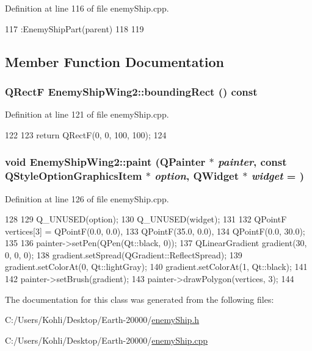 Definition at line 116 of file enemyShip.cpp.


\begin{DoxyCode}
117         :EnemyShipPart(parent)
118 {
119 }
\end{DoxyCode}


\subsection{Member Function Documentation}
\hypertarget{class_enemy_ship_wing2_aa7bb8e6e12d7f1853fbcfdac6d6a714a}{
\subsubsection[{boundingRect}]{\setlength{\rightskip}{0pt plus 5cm}QRectF EnemyShipWing2::boundingRect () const}}
\label{class_enemy_ship_wing2_aa7bb8e6e12d7f1853fbcfdac6d6a714a}


Definition at line 121 of file enemyShip.cpp.


\begin{DoxyCode}
122 {
123     return QRectF(0, 0, 100, 100);
124 }
\end{DoxyCode}
\hypertarget{class_enemy_ship_wing2_a85748bd6053efae322ff6eea88a31dea}{
\subsubsection[{paint}]{\setlength{\rightskip}{0pt plus 5cm}void EnemyShipWing2::paint (QPainter $\ast$ {\em painter}, \/  const QStyleOptionGraphicsItem $\ast$ {\em option}, \/  QWidget $\ast$ {\em widget} = {})}}
\label{class_enemy_ship_wing2_a85748bd6053efae322ff6eea88a31dea}


Definition at line 126 of file enemyShip.cpp.


\begin{DoxyCode}
128 {
129     Q_UNUSED(option);
130     Q_UNUSED(widget);
131 
132     QPointF vertices[3] = {QPointF(0.0, 0.0),
133                                      QPointF(35.0, 0.0),
134                                      QPointF(0.0, 30.0)};
135 
136     painter->setPen(QPen(Qt::black, 0));
137     QLinearGradient gradient(30, 0, 0, 0);
138     gradient.setSpread(QGradient::ReflectSpread);
139     gradient.setColorAt(0, Qt::lightGray);
140     gradient.setColorAt(1, Qt::black);
141 
142     painter->setBrush(gradient);
143     painter->drawPolygon(vertices, 3);
144 }
\end{DoxyCode}


The documentation for this class was generated from the following files:\begin{DoxyCompactItemize}
\item 
C:/Users/Kohli/Desktop/Earth-\/20000/\hyperlink{enemy_ship_8h}{enemyShip.h}\item 
C:/Users/Kohli/Desktop/Earth-\/20000/\hyperlink{enemy_ship_8cpp}{enemyShip.cpp}\end{DoxyCompactItemize}
